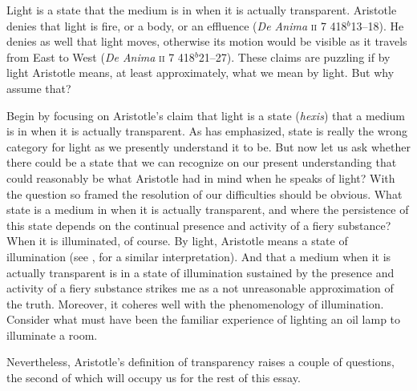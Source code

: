 \documentclass[12pt]{article}
\begin{document}
Light is a state that the medium is in when it is actually transparent. Aristotle denies that light is fire, or a body, or an effluence (\emph{De Anima} \textsc{ii} 7 418\( ^{b} \)13--18). He denies as well that light moves, otherwise its motion would be visible as it travels from East to West (\emph{De Anima} \textsc{ii} 7 418\( ^{b} \)21--27). These claims are puzzling if by light Aristotle means, at least approximately, what we mean by light. But why assume that? 

Begin by focusing on Aristotle's claim that light is a state (\emph{hexis}) that a medium is in when it is actually transparent. As \citet{Burnyeat:1995fk} has emphasized, state is really the wrong category for light as we presently understand it to be. But now let us ask whether there could be a state that we can recognize on our present understanding that could reasonably be what Aristotle had in mind when he speaks of light? With the question so framed the resolution of our difficulties should be obvious. What state is a medium in when it is actually transparent, and where the persistence of this state depends on the continual presence and activity of a fiery substance? When it is illuminated, of course. By light, Aristotle means a state of illumination (see \citealt[122]{Thorp:1982fk}, for a similar interpretation). And that a medium when it is actually transparent is in a state of illumination sustained by the presence and activity of a fiery substance strikes me as a not unreasonable approximation of the truth. Moreover, it coheres well with the phenomenology of illumination. Consider what must have been the familiar experience of lighting an oil lamp to illuminate a room.

Nevertheless, Aristotle's definition of transparency raises a couple of questions, the second of which will occupy us for the rest of this essay.
\end{document}
